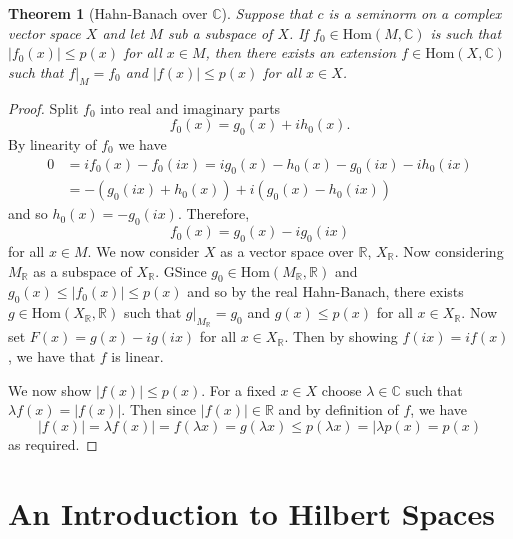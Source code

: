 \documentclass[10pt, oneside, reqno]{amsbook}
\theoremstyle{plain}%
\newtheorem{thm}{Theorem}[section]
\theoremstyle{definition}
\theoremstyle{remark}
\newcommand{\R}{\mathbb{R}}
\newcommand{\Com}{\mathbb{C}}
\begin{document}
\begin{thm}[Hahn-Banach over $\Com$]
    Suppose that $c$ is a seminorm on a complex vector space $X$ and let $M$ sub a subspace of $X$.  If $f_0 \in \text{Hom}(M, \Com)$ is such that $|f_0(x) | \leq p(x)$ for all $x \in M$, then there exists an extension $f \in \text{Hom}(X, \Com)$ such that $f|_M = f_0$ and $|f(x)| \leq p(x)$ for all $x \in X$.  
\end{thm} 

\begin{proof}
    Split $f_0$ into real and imaginary parts \[
        f_0(x) = g_0(x) + ih_0(x).
    \]  By linearity of $f_0$ we have \begin{align*}
        0   &= if_0(x) - f_0(ix) = ig_0(x) - h_0(x) - g_0(ix) - ih_0(ix) \\
            &= -(g_0(ix) + h_0(x) ) + i(g_0(x) - h_0(ix))
    \end{align*} and so $h_0(x) = -g_0(ix)$.  Therefore, \[
        f_0(x) = g_0(x) - ig_0(ix)
    \] 
    for all $x \in M$.  We now consider $X$ as a vector space over $\R$, $X_\R$.  Now considering $M_\R$ as a subspace of $X_\R$.  GSince $g_0 \in \text{Hom}(M_\R, \R)$ and $g_0(x) \leq |f_0(x)| \leq p(x)$ and so by the real Hahn-Banach, there exists $g \in \text{Hom}(X_\R, \R)$ such that $g|_{M_\R} = g_0$ and $g(x) \leq p(x)$ for all $x \in X_\R$.  Now set $F(x) = g(x) - ig(ix)$ for all $x \in X_\R$.  Then by showing $f(ix) = if(x)$, we have that $f$ is linear.  
    
    We now show $|f(x)| \leq p(x)$.  For a fixed $x \in X$ choose $\lambda \in \Com$ such that $\lambda f(x) = |f(x)|$.  Then since $|f(x)| \in \R$ and by definition of $f$, we have \[
        |f(x)| = \lambda f(x) | = f(\lambda x) = g(\lambda x) \leq p(\lambda x) = |\lambda p(x) = p(x)
    \] as required.  
 \end{proof}
% 
\chapter{An Introduction to Hilbert Spaces}

\end{document}
